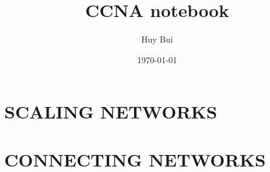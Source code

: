\documentclass[]{book}
\author{Huy Bui}
\title{CCNA notebook}
\date{\today}
\theoremstyle{definition}
\begin{document}
\thispagestyle{empty}{\tableofcontents}
\listoffigures
\listoftables

\part{SCALING NETWORKS}










\part{CONNECTING NETWORKS}







\end{document}
